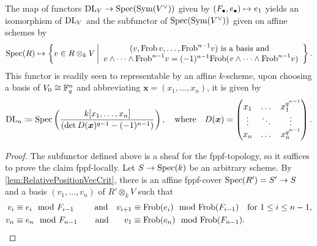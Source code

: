 \documentclass[../main.tex]{subfiles}
\begin{document}
\begin{prop}\label{prop:prop_YwExplicitely}
  The map of functors $\mathrm{DL}_V \to \operatorname{Spec}(\operatorname{Sym}(V^\vee))$ given by 
  $(F_\bullet, e_\bullet) \mapsto e_1$ 
  yields an isomorphism of $\mathrm{DL}_V$ and the subfunctor of $\operatorname{Spec}(\operatorname{Sym}(V^\vee))$ given on
  affine schemes by
  \begin{equation*}
    \spec(R) \mapsto \left\{v \in R \otimes_k V \, \bigg \vert
      \begin{array}c 
        (v, \Frob\, v, \dots, \Frob^{n-1} v) \text{ is a basis and } \\ 
        v \wedge \dots \wedge \Frob^{n-1} v = (-1)^{n-1} \Frob( v \wedge \dots
        \wedge \Frob^{n-1}v) 
      \end{array}\right\}.
  \end{equation*}
  This functor is readily seen to representable by an 
  affine $k$-scheme,
  upon choosing a basis of $V_0 \cong \mathbb{F}_q^n$ and
  abbreviating $\boldsymbol x = (x_1, \dots, x_n)$, it is given by
  \begin{equation*}
    \mathrm{DL}_n \coloneq \operatorname{Spec} \left(\frac{k[x_1, \dots, x_n]}{\left(
        \det D(\boldsymbol x)^{q-1} - (-1)^{n-1}\right)} \right), \quad
        \text{where} \quad D(\boldsymbol x) = 
          \begin{pmatrix}
            x_1 & \dots & x_1^{q^{n-1}}\\
            \vdots & \ddots  & \vdots \\
            x_n & \dots & x_n^{q^{n-1}}
          \end{pmatrix}.
  \end{equation*}
\begin{proof}
  The subfunctor defined above is a sheaf for the fppf-topology, so it suffices to prove the claim fppf-locally.
  Let $S \to \operatorname{Spec}(k)$ be an arbitrary scheme. By \cref{lem:RelativePositionVecCrit}, there is 
  an affine fppf-cover $\operatorname{Spec}(R') = S' \to S$ and a basis 
  $(v_1, \dots, v_n)$ of $R' \otimes_k V$ such that 
  \begin{equation}\label{eq:conditionsonvecs}
    \begin{aligned}
      v_i &\equiv e_i \mod F_{i-1} \quad &\text{and} \quad v_{i+1} &\equiv
      \mathrm{Frob}(e_i) \mod {\mathrm{Frob}}(F_{i-1}) \quad \text{for } 1 \leq i \leq n-1,\\ 
      v_n &\equiv e_n \mod F_{n-1} \quad &\text{and}\hspace{0.8em}\quad  v_1 &\equiv
    \mathrm{Frob}(e_n) \mod {\mathrm{Frob}}(F_{n-1}).
  \end{aligned}
\end{equation}

\end{proof}
\end{prop}
\end{document}
